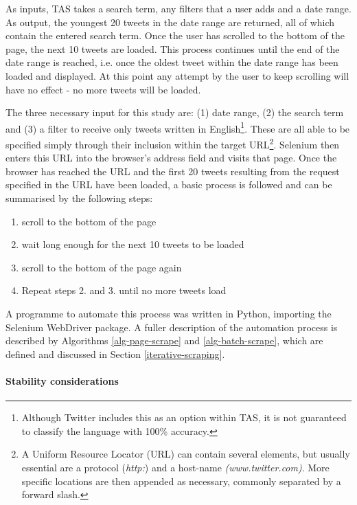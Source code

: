 \documentclass{article}
\begin{document}
As inputs, TAS takes a search term, any filters that a user adds and a date range. As output, the youngest 20 tweets in the date range are returned, all of which contain the entered search term. Once the user has scrolled to the bottom of the page, the next 10 tweets are loaded. This process continues until the end of the date range is reached, i.e. \hspace{-6pt} once the oldest tweet within the date range has been loaded and displayed. At this point any attempt by the user to keep scrolling will have no effect - no more tweets will be loaded.

The three necessary input for this study are: (1) date range, (2) the search term and (3) a filter to receive only tweets written in English\footnote{Although Twitter includes this as an option within TAS, it is not guaranteed to classify the language with 100\% accuracy.}. These are all able to be specified simply through their inclusion within the target URL\footnote{A Uniform Resource Locator (URL) can contain several elements, but usually essential are a protocol (\emph{http:}) and a host-name \emph{(www.twitter.com)}. More specific locations are then appended as necessary, commonly separated by a forward slash.}. Selenium then enters this URL into the browser's address field and visits that page. Once the browser has reached the URL and the first 20 tweets resulting from the request specified in the URL have been loaded, a basic process is followed and can be summarised by the following steps:

\begin{enumerate}
\item scroll to the bottom of the page
\item wait long enough for the next 10 tweets to be loaded
\item scroll to the bottom of the page again
\item Repeat steps 2. and 3. until no more tweets load
\end{enumerate}

A programme to automate this process was written in Python, importing the Selenium WebDriver package. A fuller description of the automation process is described by Algorithms \eqref{alg-page-scrape} and \eqref{alg-batch-scrape}, which are defined and discussed in Section \ref{iterative-scraping}.


\paragraph{Stability considerations}
\label{sec-3-3-2-1}
\end{document}
